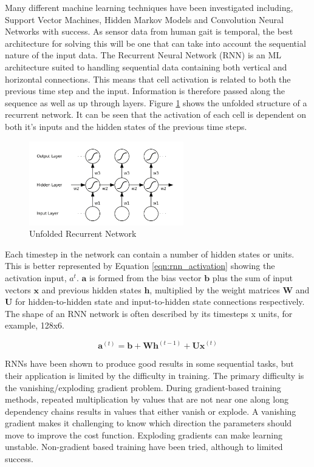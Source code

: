 \documentclass[sensors,article,submit,moreauthors,pdftex]{Definitions/mdpi}
\begin{document}
Many different machine learning techniques have been investigated including, Support Vector Machines, Hidden Markov Models and Convolution Neural Networks with success\cite{Labarriere2020}. As sensor data from human gait is temporal, the best architecture for solving this will be one that can take into account the sequential nature of the input data. The Recurrent Neural Network (RNN) is an ML architecture suited to handling sequential data containing both vertical and horizontal connections. This means that cell activation is related to both the previous time step and the input. Information is therefore passed along the sequence as well as up through layers. Figure \ref{fig:rnn_structure} shows the unfolded structure of a recurrent network. It can be seen that the activation of each cell is dependent on both it's inputs and the hidden states of the previous time steps.

\begin{figure}[!hbt]
    \centering
    \includegraphics[width=0.6\textwidth]{Figures/lstm/rnn_structure.png}
    \caption{Unfolded Recurrent Network \cite{Graves2012}}
    \label{fig:rnn_structure}
\end{figure}

Each timestep in the network can contain a number of hidden states or units. This is better represented by Equation \ref{eqn:rnn_activation} showing the activation input, $a^t$. $\mathbf{a}$ is formed from the bias vector $\mathbf{b}$ plus the sum of input vectors $\mathbf{x}$ and previous hidden states $\mathbf{h}$, multiplied by the weight matrices $\mathbf{W}$ and $\mathbf{U}$ for hidden-to-hidden state and input-to-hidden state connections respectively.\cite{Goodfellow2015} The shape of an RNN network is often described by its timesteps x units, for example, 128x6.

\begin{equation}
    \mathbf{a}^{(t)} = \mathbf{b} + \mathbf{Wh}^{(t-1)} + \mathbf{Ux}^{(t)}
    \label{eqn:rnn_activation}
\end{equation}

RNNs have been shown to produce good results in some sequential tasks, but their application is limited by the difficulty in training. The primary difficulty is the vanishing/exploding gradient problem. During gradient-based training methods, repeated multiplication by values that are not near one along long dependency chains results in values that either vanish or explode. A vanishing gradient makes it challenging to know which direction the parameters should move to improve the cost function. Exploding gradients can make learning unstable. Non-gradient based training have been tried, although to limited success. \cite{Graves2012, Goodfellow2015}
\end{document}
